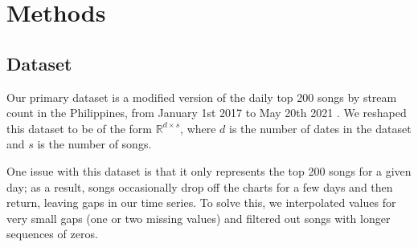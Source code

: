 \documentclass[11pt]{article}
\begin{document}
% 
% 
% 
% 
\section{Methods}

\subsection{Dataset}
Our primary dataset is a modified version of the daily top 200 songs by stream count in the Philippines, from January 1st 2017 to May 20th 2021 \cite{peralta_spotify_nodate}. We reshaped this dataset to be of the form $\mathbb{R}^{d \times s}$, where $d$ is the number of dates in the dataset and $s$ is the number of songs.

One issue with this dataset is that it only represents the top 200 songs for a given day; as a result, songs occasionally drop off the charts for a few days and then return, leaving gaps in our time series. To solve this, we interpolated values for very small gaps (one or two missing values) and filtered out songs with longer sequences of zeros. 
\end{document}
